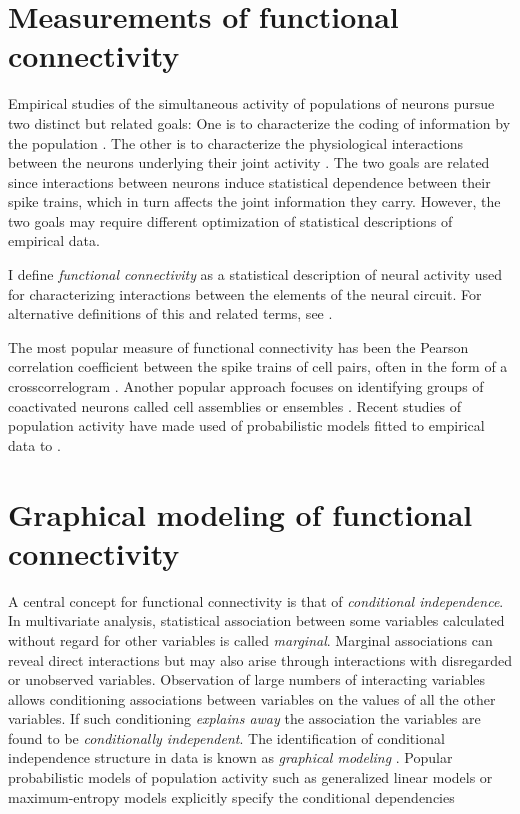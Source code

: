 \section{Measurements of functional connectivity}
Empirical studies of the simultaneous activity of populations of neurons pursue two distinct but related goals: 
One is to characterize the coding of information by the population  \citep{Zohary:1994,Averbeck:2006,Ecker:2011}. 
The other is to characterize the physiological interactions between the neurons underlying their joint activity \citep{Feldt:2011}.
The two goals are related since interactions between neurons induce statistical dependence between their spike trains, which in turn affects the joint information they carry. 
However, the two goals may require different optimization of statistical descriptions of empirical data. 

I define \emph{functional connectivity} as a statistical description of neural activity used for characterizing interactions between the elements of the neural circuit. 
For alternative definitions of this and related terms, see \cite{Feldt:2011,Friston:2011}.

The most popular measure of functional connectivity has been the Pearson correlation coefficient between the spike trains of cell pairs, often in the form of a crosscorrelogram \citep{Gerstein:1969, Denman:2013, Sadovsky:2014}. 
Another popular approach focuses on identifying groups of coactivated neurons called cell assemblies or ensembles \citep{Gerstein:1989,Kenet:2003,Harris:2005,Ch:2010,Miller:2014}.  
Recent studies of population activity have made used of probabilistic models fitted to empirical data to \citep{Stevenson:2008,Hertz:2011,Ganmor:2011}.

\section{Graphical modeling of functional connectivity}
A central concept for functional connectivity is that of \emph{conditional independence}. 
In multivariate analysis, statistical association between some variables calculated without regard for other variables is called \emph{marginal}.
Marginal associations can reveal direct interactions but may also arise through interactions with disregarded or unobserved variables. 
Observation of large numbers of interacting variables allows conditioning associations between variables on the values of all the other variables.  
If such conditioning \emph{explains away} the association the variables are found to be  \emph{conditionally independent}.
The identification of conditional independence structure in data is known as \emph{graphical modeling} \citep{Whitaker:1990, Koller:2009}.
Popular probabilistic models of population activity such as generalized linear models \citep{Pillow:2008} or maximum-entropy models \citep{Hertz:2011} explicitly specify the conditional dependencies  

